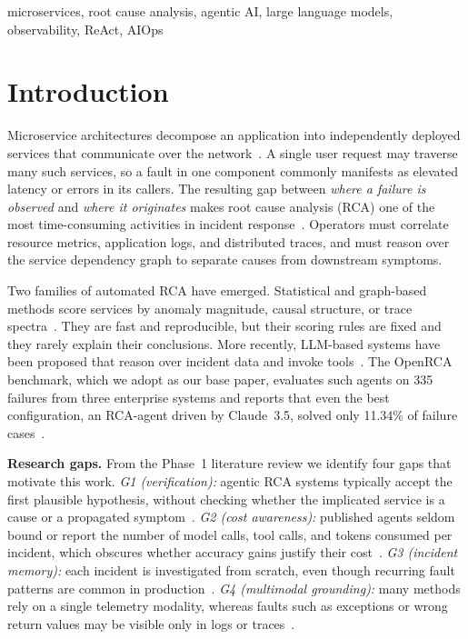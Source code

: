 \documentclass[conference]{IEEEtran}
\begin{document}
\begin{IEEEkeywords}
microservices, root cause analysis, agentic AI, large language models, observability, ReAct, AIOps
\end{IEEEkeywords}

\section{Introduction}

Microservice architectures decompose an application into independently deployed services that communicate over the network~\cite{dragoni2017microservices}. A single user request may traverse many such services, so a fault in one component commonly manifests as elevated latency or errors in its callers. The resulting gap between \emph{where a failure is observed} and \emph{where it originates} makes root cause analysis (RCA) one of the most time-consuming activities in incident response~\cite{soldani2022survey,zhou2021trainticket}. Operators must correlate resource metrics, application logs, and distributed traces, and must reason over the service dependency graph to separate causes from downstream symptoms.

Two families of automated RCA have emerged. Statistical and graph-based methods score services by anomaly magnitude, causal structure, or trace spectra~\cite{wu2020microrca,wang2018cloudranger,meng2020microcause,yu2021microrank,li2021tracerca,li2022circa,pham2024baro}. They are fast and reproducible, but their scoring rules are fixed and they rarely explain their conclusions. More recently, LLM-based systems have been proposed that reason over incident data and invoke tools~\cite{ahmed2023recommending,chen2024rcacopilot,wang2024rcagent,roy2024exploring}. The OpenRCA benchmark, which we adopt as our base paper, evaluates such agents on 335 failures from three enterprise systems and reports that even the best configuration, an RCA-agent driven by Claude~3.5, solved only 11.34\% of failure cases~\cite{xu2025openrca}.

\textbf{Research gaps.} From the Phase~1 literature review we identify four gaps that motivate this work. \emph{G1 (verification):} agentic RCA systems typically accept the first plausible hypothesis, without checking whether the implicated service is a cause or a propagated symptom~\cite{xu2025openrca,roy2024exploring}. \emph{G2 (cost awareness):} published agents seldom bound or report the number of model calls, tool calls, and tokens consumed per incident, which obscures whether accuracy gains justify their cost~\cite{chen2023frugalgpt}. \emph{G3 (incident memory):} each incident is investigated from scratch, even though recurring fault patterns are common in production~\cite{chen2024rcacopilot}. \emph{G4 (multimodal grounding):} many methods rely on a single telemetry modality, whereas faults such as exceptions or wrong return values may be visible only in logs or traces~\cite{yu2023nezha,lee2023eadro}.
\end{document}
